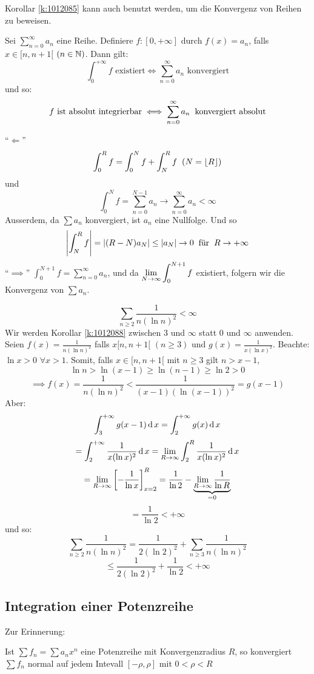 \begin{Bem} Korollar \ref{k:1012085} kann auch benutzt werden, um die Konvergenz von Reihen zu beweisen.
\end{Bem}
\begin{Kor}\label{k:1012088} 
Sei $\sum^\infty_{n=0} a_n$ eine Reihe. Definiere $f:[0,+\infty]$ durch $f(x)=a_n$, falls $x\in[n,n+1[$ $(n\in \mathbb{N})$. Dann gilt:
  \[\int_0^{+\infty}f \mbox{ existiert} \iff \sum_{n=0}^\infty a_n \mbox{ konvergiert}\]
  und so:
  \[f \mbox{ ist absolut integrierbar} \iff \sum_{n=0}^\infty a_n\hspace{2mm}\text{konvergiert absolut}\]
\end{Kor}
\begin{Bew}
  ``$\Leftarrow$''
  \[\int_0^Rf=\int_0^Nf+\int_N^Rf\hspace{2mm}(N=\left\lfloor R \right\rfloor)\]
  und
  \[\int_0^N f=\sum_{n=0}^{N-1}a_n\rightarrow\sum^\infty_{n=0}a_n<\infty\]
  Ausserdem, da $\sum a_n$ konvergiert, ist $a_n$ eine Nullfolge. Und so
  \[\left|\int_N^Rf\right|=\left|(R-N)a_N\right|\leq\mathopen| a_N \mathclose|\rightarrow 0\hspace{2mm}\text{für}\hspace{2mm} R\to +\infty\]
  ``$\implies$'' $\int_0^{N+1}f=\sum^\infty_{n=0}a_n$, und da $\displaystyle\lim_{N\rightarrow\infty}\int_0^{N+1}f$ existiert, folgern wir die Konvergenz von $\sum a_n$.
\end{Bew}
\begin{Bsp}
  \[\sum_{n\geq 2}\frac{1}{n(\ln n)^2}<\infty\]
  Wir werden Korollar \ref{k:1012088} zwischen 3 und $\infty$ statt $0$ und $\infty$ anwenden. Seien $f(x)=\frac{1}{n(\ln n)^2}$ falls $x[n,n+1[$ $(n\geq 3)$ und $g(x)=\frac{1}{x(\ln x)^2}$. Beachte: $\ln x>0$
$\forall x>1$. Somit, falls $x\in[n,n+1[$ mit $n\geq 3$ gilt $n>x-1$,
  \[\ln n>\ln(x-1)\geq \ln(n-1)\geq\ln 2>0\]
  \[\implies f(x)=\frac{1}{n(\ln n)^2}<\frac{1}{(x-1)(\ln(x-1))^2}=g(x-1)\]
  Aber:
  \[\int_3^{+\infty}g(x-1)\operatorname{d} x=\int_2^{+\infty}g(x)\operatorname{d} x\]
  \[=\int_2^{+\infty}\frac{1}{x(\ln x)^2}\operatorname{d} x=\displaystyle\lim_{R\rightarrow\infty}\int_2^R\frac{1}{x(\ln x)^2}\operatorname{d} x\]
  \[=\displaystyle\lim_{R\rightarrow\infty}\left[ -\frac{1}{\ln x} \right]^R_{x=2}=\frac{1}{\ln 2}-\underbrace{\displaystyle\lim_{R\rightarrow\infty}\frac{1}{\ln R}}_{=0}\]
  \[=\frac{1}{\ln 2}< +\infty\]
  und so:
  \[\sum_{n\geq 2}\frac{1}{n(\ln n)^2}=\frac{1}{2(\ln 2)^2}+\sum_{n\geq 3}\frac{1}{n(\ln n)^2}\]
  \[\leq\frac{1}{2(\ln 2)^2}+\frac{1}{\ln 2}< +\infty\]
\end{Bsp}
\subsection{Integration einer Potenzreihe}
  
Zur Erinnerung:

\begin{Sat}\label{s:1012080}
 Ist $\sum f_n=\sum a_nx^n$ eine Potenzreihe mit Konvergenzradius $R$, so konvergiert $\sum f_n$ normal auf jedem Intevall $[-\rho, \rho]$ mit $0<\rho<R$
\end{Sat}


